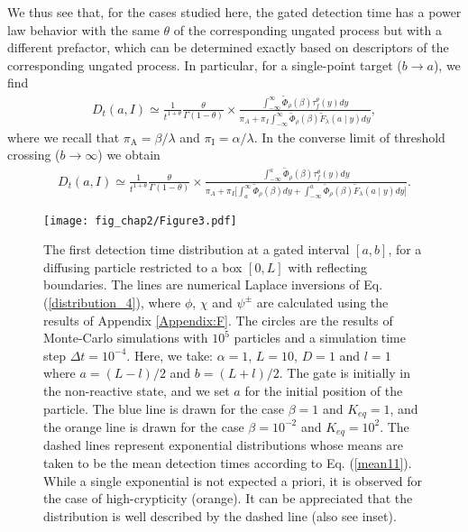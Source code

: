 We thus see that, for the cases studied here, the gated detection time has a power law behavior with the same $\theta$ of the corresponding ungated process but with a different prefactor, which can be determined exactly based on descriptors of the corresponding ungated process. In particular, for a single-point target ($b \to a$), we find
%
\begin{align} \label{asymptot2}
 D_t(a, I) \simeq  \frac{1}{t^{1+\theta}} \frac{\theta}{\Gamma(1-\theta)} \times \frac{\int^{\infty}_{-\infty} \widetilde{\Phi}_{\rho}(\beta)\tau^{\theta}_f(y) dy}{\pi_{A} +\pi_{I} \int^{\infty}_{-\infty} \widetilde{\Phi}_{\rho}(\beta) \widetilde{F}_\lambda(a\mid y) dy },
\end{align}
%
where we recall that $\pi_{\textrm{A}}=\beta / \lambda$ and $\pi_{\textrm{I}}=\alpha / \lambda$. In the converse limit of threshold crossing ($b \to \infty$) we obtain
%
\begin{align} \label{asymptot3}
 D_t(a, I) \simeq \frac{1}{t^{1+\theta}} \frac{\theta}{\Gamma(1-\theta)} \times \frac{\int^{a}_{-\infty} \widetilde{\Phi}_{\rho}(\beta)\tau^{\theta}_f(y) dy}{\pi_{A} +\pi_{I} \Big[\int^{\infty}_{a} \widetilde{\Phi}_{\rho}(\beta)dy + \int^{a}_{-\infty} \widetilde{\Phi}_{\rho}(\beta) \widetilde{F}_\lambda(a \mid y) dy  \Big] } .  
\nonumber 
\end{align}


\begin{figure}[h]
\centering
\texttt{[image: fig\_chap2/Figure3.pdf]}
    \caption{The first detection time distribution at a gated interval $[a,b]$, for a diffusing particle restricted to a box $[0,L]$ with reflecting boundaries. The lines are numerical Laplace inversions of Eq. (\ref{distribution_4}), where $\phi$, $\chi$ and $\psi^{\pm}$ are calculated using the results of Appendix \ref{Appendix:F}. The circles are the results of Monte-Carlo simulations with $10^5$ particles and a simulation time step $\Delta t = 10^{-4}$. Here, we take: $\alpha=1$, $L=10$, $D=1$ and $l=1$ where $a=(L-l)/2$ and $b=(L+l)/2$. The gate is initially in the non-reactive state, and we set $a$ for the initial position of the particle. The blue line is drawn for the case $\beta=1$ and $K_{eq}=1$, and the orange line is drawn for the case $\beta=10^{-2}$ and $K_{eq}=10^{2}$.  The dashed lines represent exponential distributions whose means are taken to be the mean detection times according to Eq. (\ref{mean11}). While a single exponential is not expected a priori, it is observed for the case of high-crypticity (orange). It can be appreciated that the distribution is well described by the dashed line (also see inset).}
    \label{fig3}
\end{figure}

